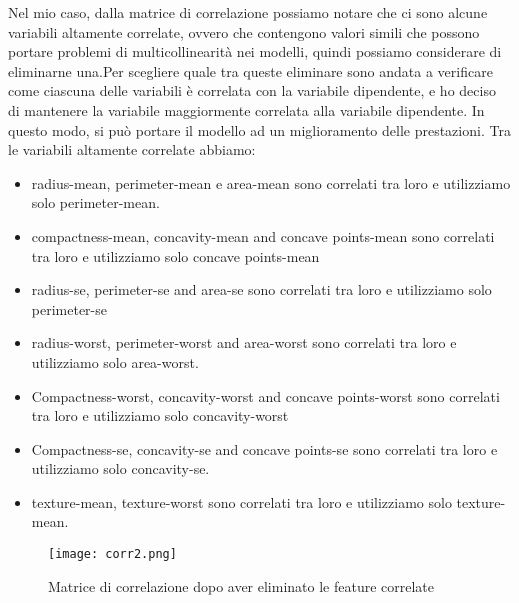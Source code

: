 \documentclass{article}
\begin{document}
Nel mio caso, dalla matrice di correlazione possiamo notare che ci sono alcune variabili altamente correlate, ovvero che contengono valori simili che possono portare problemi di multicollinearità nei modelli, quindi possiamo considerare di eliminarne una.Per scegliere quale tra queste eliminare sono andata a verificare come ciascuna delle variabili è correlata con la variabile dipendente, e ho deciso di mantenere la variabile maggiormente correlata alla variabile dipendente. In questo modo, si può portare il modello ad un miglioramento delle prestazioni.
Tra le variabili altamente correlate abbiamo:
\begin{itemize}
    \item  radius-mean, perimeter-mean e area-mean sono correlati tra loro e utilizziamo solo perimeter-mean.
    \item compactness-mean, concavity-mean and concave points-mean sono correlati tra loro e utilizziamo solo  concave points-mean
    \item radius-se, perimeter-se and area-se sono correlati tra loro e utilizziamo solo  perimeter-se
    \item radius-worst, perimeter-worst and area-worst sono correlati tra loro e utilizziamo solo  area-worst.
    \item Compactness-worst, concavity-worst and concave points-worst sono correlati tra loro e utilizziamo solo  concavity-worst
    \item Compactness-se, concavity-se and concave points-se sono correlati tra loro e utilizziamo solo  concavity-se.
    \item texture-mean, texture-worst  sono correlati tra loro e utilizziamo solo  texture-mean.
\end{itemize}
\begin{figure}
    \centering
    \texttt{[image: corr2.png]}
    \caption{Matrice di correlazione dopo aver eliminato le feature correlate}
    \label{fig:enter-label}
\end{figure}

\newpage
\end{document}
